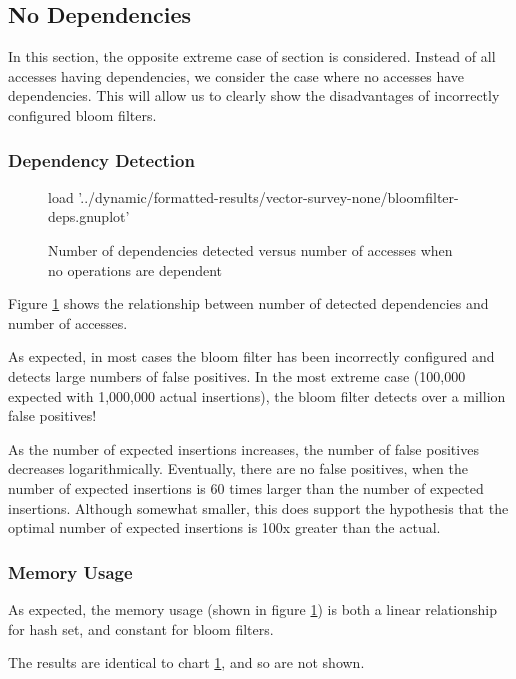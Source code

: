	\subsection{No Dependencies} \label{sec:results/none}
		In this section, the opposite extreme case of section \label{sec:results/all} is considered. Instead of all accesses having dependencies, we consider the case where no accesses have dependencies. This will allow us to clearly show the disadvantages of incorrectly configured bloom filters.
	
		\subsubsection{Dependency Detection} \label{sec:results/none/deps}
		\begin{figure}
			\centering
			\begin{gnuplot}[terminal=pdf]
			load '../dynamic/formatted-results/vector-survey-none/bloomfilter-deps.gnuplot'
			\end{gnuplot}
			\caption{Number of dependencies detected versus number of accesses when no operations are dependent}
			\label{chart:none-dep}
		\end{figure}
		
		Figure \ref{chart:none-dep} shows the relationship between number of detected dependencies and number of accesses.
		
		As expected, in most cases the bloom filter has been incorrectly configured and detects large numbers of false positives. In the most extreme case (100,000 expected with 1,000,000 actual insertions), the bloom filter detects over a million false positives!
		
		As the number of expected insertions increases, the number of false positives decreases logarithmically. Eventually, there are no false positives, when the number of expected insertions is 60 times larger than the number of expected insertions. Although somewhat smaller, this does support the hypothesis that the optimal number of expected insertions is 100x greater than the actual.
		
		\subsubsection{Memory Usage} \label{sec:results/none/mem}
		As expected, the memory usage (shown in figure \ref{chart:none-dep}) is both a linear relationship for hash set, and constant for bloom filters.
		
		The results are identical to chart \ref{chart:none-dep}, and so are not shown.
		
